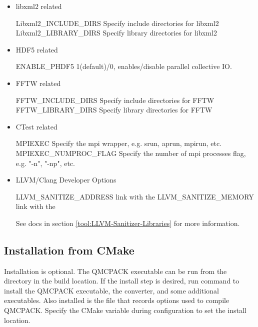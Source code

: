 \begin{itemize}
\item libxml2 related
%
\begin{shade}
Libxml2_INCLUDE_DIRS   Specify include directories for libxml2
Libxml2_LIBRARY_DIRS   Specify library directories for libxml2
\end{shade}

\item HDF5 related
%
\begin{shade}
ENABLE_PHDF5    1(default)/0, enables/disable parallel collective IO.
\end{shade}

\item FFTW related
%
\begin{shade}
FFTW_INCLUDE_DIRS   Specify include directories for FFTW
FFTW_LIBRARY_DIRS   Specify library directories for FFTW
\end{shade}

\item CTest related
%
\begin{shade}
MPIEXEC                Specify the mpi wrapper, e.g. srun, aprun, mpirun, etc.
MPIEXEC_NUMPROC_FLAG   Specify the number of mpi processes flag,
                       e.g. "-n", "-np", etc.
\end{shade}

\item LLVM/Clang Developer Options\\
\begin{shade}
LLVM_SANITIZE_ADDRESS     link with the %
LLVM_SANITIZE_MEMORY      link with the %
\end{shade}

See docs in section \ref{tool:LLVM-Sanitizer-Libraries} for more information.
\end{itemize}

\subsection{Installation from CMake}
Installation is optional. The QMCPACK executable can be run from the  directory in the build location.
If the install step is desired, run  command to install the QMCPACK executable, the converter,
and some additional executables.
Also installed is the  file that records options used to compile QMCPACK.
Specify the  CMake variable during configuration to set the install location.


